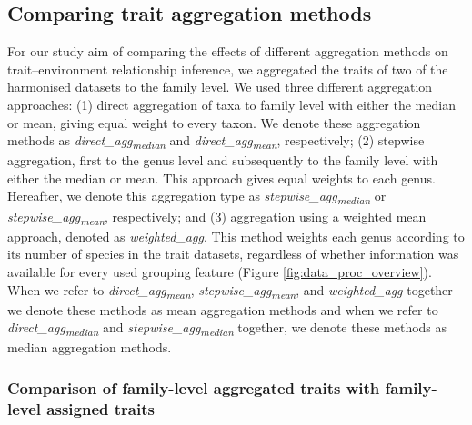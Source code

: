 \documentclass{article}
\begin{document}

\subsection*{Comparing trait aggregation methods}

For our study aim of comparing the effects of different aggregation methods on trait–environment relationship inference, we aggregated the traits of two of the harmonised datasets to the family level.
We used three different aggregation approaches: (1) direct aggregation of taxa to family level with either the median or mean, giving equal weight to every taxon. We denote these aggregation methods as \textit{direct\_agg\textsubscript{median}} and \textit{direct\_agg\textsubscript{mean}}, respectively; (2) stepwise aggregation, first to the genus level and subsequently to the family level with either the median or mean. This approach gives equal weights to each genus. Hereafter, we denote this aggregation type as \textit{stepwise\_agg\textsubscript{median}} or \textit{stepwise\_agg\textsubscript{mean}}, respectively; and (3) aggregation using a weighted mean approach, denoted as \textit{weighted\_agg}. This method weights each genus according to its number of species in the trait datasets, regardless of whether information was available for every used grouping feature (Figure \ref{fig:data_proc_overview}). When we refer to \textit{direct\_agg\textsubscript{mean}}, \textit{stepwise\_agg\textsubscript{mean}}, and \textit{weighted\_agg} together we denote these methods as mean aggregation methods and when we refer to \textit{direct\_agg\textsubscript{median}} and \textit{stepwise\_agg\textsubscript{median}} together, we denote these methods as median aggregation methods.


\subsubsection*{Comparison of family-level aggregated traits with family-level assigned traits}
\end{document}
